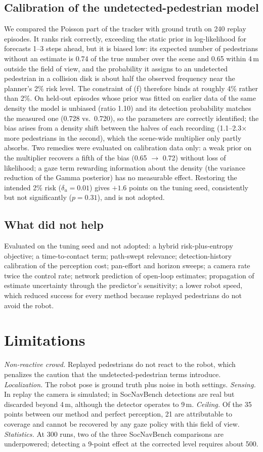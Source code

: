 \documentclass[letterpaper, 10 pt, conference]{ieeeconf}
\begin{document}
\subsection{Calibration of the undetected-pedestrian model}
We compared the Poisson part of the tracker with ground truth on 240 replay episodes. It ranks risk correctly, exceeding the static prior in log-likelihood for forecasts 1--3 steps ahead, but it is biased low: its expected number of pedestrians without an estimate is 0.74 of the true number over the scene and 0.65 within 4\,m outside the field of view, and the probability it assigns to an undetected pedestrian in a collision disk is about half the observed frequency near the planner's 2\% risk level. The constraint of (f) therefore binds at roughly 4\% rather than 2\%. On held-out episodes whose prior was fitted on earlier data of the same density the model is unbiased (ratio 1.10) and its detection probability matches the measured one (0.728 vs.\ 0.720), so the parameters are correctly identified; the bias arises from a density shift between the halves of each recording (1.1--2.3$\times$ more pedestrians in the second), which the scene-wide multiplier only partly absorbs. Two remedies were evaluated on calibration data only: a weak prior on the multiplier recovers a fifth of the bias (0.65 $\to$ 0.72) without loss of likelihood; a gaze term rewarding information about the density (the variance reduction of the Gamma posterior) has no measurable effect. Restoring the intended 2\% risk ($\delta_u{=}0.01$) gives $+1.6$ points on the tuning seed, consistently but not significantly ($p{=}0.31$), and is not adopted.

\subsection{What did not help}
Evaluated on the tuning seed and not adopted: a hybrid risk-plus-entropy objective; a time-to-contact term; path-swept relevance; detection-history calibration of the perception cost; pan-effort and horizon sweeps; a camera rate twice the control rate; network prediction of open-loop estimates; propagation of estimate uncertainty through the predictor's sensitivity; a lower robot speed, which reduced success for every method because replayed pedestrians do not avoid the robot.

\section{Limitations}
\emph{Non-reactive crowd.} Replayed pedestrians do not react to the robot, which penalizes the caution that the undetected-pedestrian terms introduce. \emph{Localization.} The robot pose is ground truth plus noise in both settings. \emph{Sensing.} In replay the camera is simulated; in SocNavBench detections are real but discarded beyond 4\,m, although the detector operates to 9\,m. \emph{Ceiling.} Of the 35 points between our method and perfect perception, 21 are attributable to coverage and cannot be recovered by any gaze policy with this field of view. \emph{Statistics.} At 300 runs, two of the three SocNavBench comparisons are underpowered; detecting a 9-point effect at the corrected level requires about 500.
\end{document}
